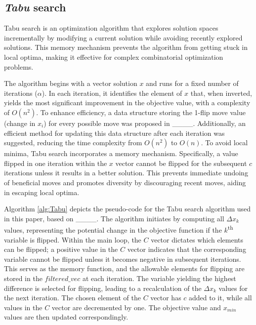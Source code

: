 \vspace{-8pt}
\subsection{\textit{Tabu} search}
Tabu search is an optimization algorithm that explores solution spaces incrementally by modifying a current solution while avoiding recently explored solutions. This memory mechanism prevents the algorithm from getting stuck in local optima, making it effective for complex combinatorial optimization problems. 

The algorithm begins with a vector solution $x$ and runs for a fixed number of iterations ($\alpha$). In each iteration, it identifies the element of $x$ that, when inverted, yields the most significant improvement in the objective value, with a complexity of $O(n^2)$. To enhance efficiency, a data structure storing the 1-flip move value (change in $x_i$) for every possible move was proposed in ____. Additionally, an efficient method for updating this data structure after each iteration was suggested, reducing the time complexity from $O(n^2)$ to $O(n)$. To avoid local minima, Tabu search incorporates a memory mechanism. Specifically, a value flipped in one iteration within the $x$ vector cannot be flipped for the subsequent $c$ iterations unless it results in a better solution. This prevents immediate undoing of beneficial moves and promotes diversity by discouraging recent moves, aiding in escaping local optima.

Algorithm \ref{alg:Tabu} depicts the pseudo-code for the Tabu search algorithm used in this paper, based on ____. The algorithm initiates by computing all $\Delta x_{k}$ values, representing the potential change in the objective function if the $k$\textsuperscript{th} variable is flipped. Within the main loop, the $C$ vector dictates which elements can be flipped; a positive value in the $C$ vector indicates that the corresponding variable cannot be flipped unless it becomes negative in subsequent iterations. This serves as the memory function, and the allowable elements for flipping are stored in the $filtered\_vec$ at each iteration. The variable yielding the highest difference is selected for flipping, leading to a recalculation of the $\Delta x_{k}$ values for the next iteration. The chosen element of the $C$ vector has $c$ added to it, while all values in the $C$ vector are decremented by one. The objective value and $x_{min}$ values are then updated correspondingly.


